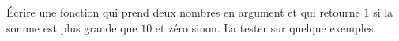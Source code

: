 
\begin{exercice}\label{exosmath-0171}

    Écrire une fonction qui prend deux nombres en argument et qui retourne \( 1\) si la somme est plus grande que \( 10\) et zéro sinon. La tester sur quelque exemples.

\end{exercice}
